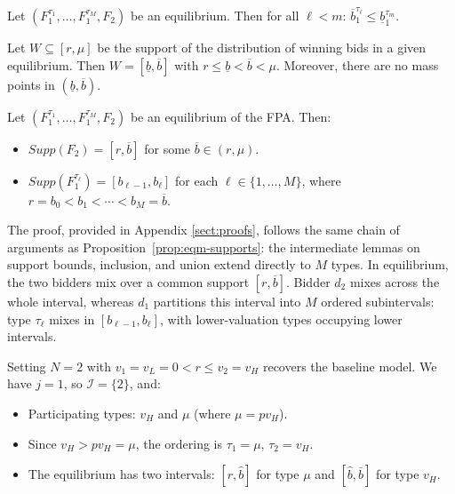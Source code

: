 \begin{lem}\label{lem:N-monotonicity}
Let $(F_1^{\tau_1}, \ldots, F_1^{\tau_M}, F_2)$ be an equilibrium. Then for all $\ell < m$: $\overline{b}_1^{\tau_\ell} \leq \underline{b}_1^{\tau_m}$.
\end{lem}

\begin{lem}\label{lem:N-interval}
Let $W \subseteq [r, \mu]$ be the support of the distribution of winning bids in a given equilibrium. Then $W = [\underline{b}, \overline{b}]$ with $r \leq \underline{b} < \overline{b} < \mu$. Moreover, there are no mass points in $(\underline{b}, \overline{b})$.
\end{lem}

\begin{prop} \label{prop:N-val-structure}
Let $(F_1^{\tau_1}, \ldots, F_1^{\tau_M}, F_2)$ be an equilibrium of the FPA. Then:
\begin{itemize}
    \item[-] $Supp(F_2) = [r, \overline{b}]$ for some $\overline{b} \in (r, \mu)$.

    

    \item[-] $Supp(F_1^{\tau_\ell}) = [b_{\ell-1}, b_\ell]$ for each $\ell \in \{1, \ldots, M\}$, where $r = b_0 < b_1 < \cdots < b_M = \overline{b}$.
\end{itemize}
\end{prop}

\noindent The proof, provided in Appendix \ref{sect:proofs}, follows the same chain of arguments as Proposition~\ref{prop:eqm-supports}: the intermediate lemmas on support bounds, inclusion, and union extend directly to $M$ types. In equilibrium, the two bidders mix over a common support $[r, \overline{b}]$. Bidder $d_2$ mixes across the whole interval, whereas $d_1$ partitions this interval into $M$ ordered subintervals: type $\tau_\ell$ mixes in $[b_{\ell-1}, b_\ell]$, with lower-valuation types occupying lower intervals.

\begin{rem}
Setting $N = 2$ with $v_1 = v_L = 0 < r \leq v_2 = v_H$ recovers the baseline model. We have $j = 1$, so $\mathcal{I} = \{2\}$, and:
\begin{itemize}
    \item Participating types: $v_H$ and $\mu$ (where $\mu = pv_H$).
    \item Since $v_H > pv_H = \mu$, the ordering is $\tau_1 = \mu$, $\tau_2 = v_H$.
    \item The equilibrium has two intervals: $[r, \hat{b}]$ for type $\mu$ and $[\hat{b}, \bar{b}]$ for type $v_H$.
\end{itemize}
\end{rem}

